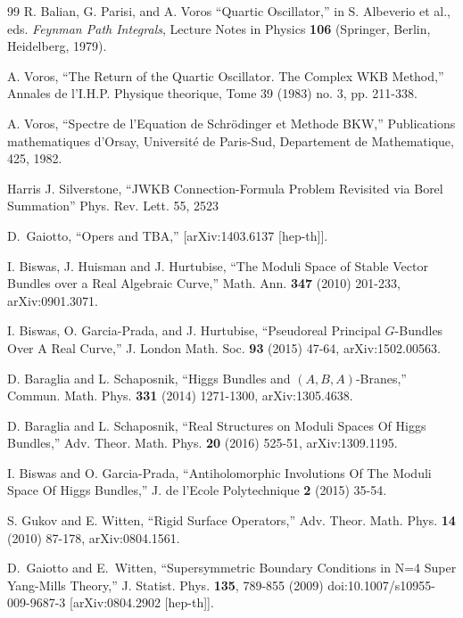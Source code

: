 \documentclass[11pt,a4paper]{article}
\begin{document}
\begin{thebibliography}{99}
R. Balian, G.  Parisi, and A.  Voros  
``Quartic Oscillator,''
in  S. Albeverio  et al., eds. {\it  Feynman Path Integrals}, Lecture Notes in Physics {\bf 106} (Springer, Berlin, Heidelberg, 1979). 

A. Voros, 
``The Return of the Quartic Oscillator. The Complex WKB Method,''
 Annales de l'I.H.P. Physique theorique, Tome 39 (1983) no. 3, pp. 211-338. 
 
A. Voros,
``Spectre de l'Equation de Schr\"{o}dinger et Methode BKW,''
Publications mathematiques d'Orsay,
Universit\'{e} de Paris-Sud, Departement de Mathematique, 425, 1982.

Harris J. Silverstone,
``JWKB Connection-Formula Problem Revisited via Borel Summation''
Phys. Rev. Lett. 55, 2523



D.~Gaiotto,
``Opers and TBA,''
[arXiv:1403.6137 [hep-th]].



I. Biswas, J. Huisman and J. Hurtubise,  ``The Moduli Space of Stable Vector Bundles over a Real Algebraic Curve,'' 
 Math. Ann. {\bf 347} (2010)  201-233, arXiv:0901.3071.


I. Biswas, O. Garcia-Prada, and J. Hurtubise, ``Pseudoreal Principal $G$-Bundles Over A Real Curve,''   J. London Math. Soc. {\bf 93} (2015) 47-64, arXiv:1502.00563.



D. Baraglia and L. Schaposnik, ``Higgs Bundles and $(A,B,A)$-Branes,'' 
Commun. Math. Phys. {\bf 331} (2014) 1271-1300, arXiv:1305.4638.

D. Baraglia and L. Schaposnik, ``Real Structures on Moduli Spaces Of Higgs Bundles,''  Adv. Theor. Math. Phys. 
{\bf 20} (2016) 525-51, arXiv:1309.1195.

 I. Biswas and O. Garcia-Prada, ``Antiholomorphic Involutions Of The Moduli Space Of Higgs Bundles,'' 
J. de l'Ecole Polytechnique {\bf 2} (2015) 35-54.

S. Gukov and E. Witten, ``Rigid Surface Operators,'' Adv. Theor. Math. Phys. {\bf 14} (2010) 87-178, arXiv:0804.1561.

D.~Gaiotto and E.~Witten,
``Supersymmetric Boundary Conditions in N=4 Super Yang-Mills Theory,''
J. Statist. Phys. \textbf{135}, 789-855 (2009)
doi:10.1007/s10955-009-9687-3
[arXiv:0804.2902 [hep-th]].



\end{thebibliography}
\end{document}
